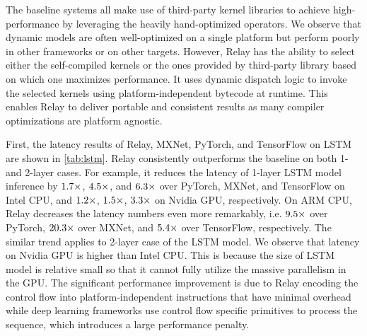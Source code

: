 The baseline systems all make use of third-party kernel libraries to achieve high-performance by leveraging the heavily hand-optimized operators. We observe that dynamic models are often well-optimized on a single platform but perform poorly in other frameworks or on other targets. However, Relay has the ability to select either the self-compiled kernels or the ones provided by third-party library based on which one maximizes performance. It uses dynamic dispatch logic to invoke the selected kernels using platform-independent bytecode at runtime. This enables Relay to deliver portable and consistent results as many compiler optimizations are platform agnostic.

First, the latency results of Relay, MXNet, PyTorch, and TensorFlow on LSTM are shown in \autoref{tab:lstm}. Relay consistently outperforms the baseline on both 1- and 2-layer cases. For example, it reduces the latency of 1-layer LSTM model inference by $\fpeval{round(79.3 / 47.8, 1)}\times$, $\fpeval{round(212.9 / 47.8, 1)}\times$, and $\fpeval{round(301.4 / 47.8, 1)}\times$ over PyTorch, MXNet, and TensorFlow on Intel CPU,
and $\fpeval{round(110.3/93.0, 1)}\times$, $\fpeval{round(135.7/93.0, 1)}\times$, $\fpeval{round(304.7/93.0, 1)}\times$ on Nvidia GPU, respectively.
On ARM CPU, Relay decreases the latency numbers even more remarkably, i.e. $\fpeval{round(1729.5 / 182.2, 1)}\times$ over PyTorch, $\fpeval{round(3695.9 / 182.2, 1)}\times$ over MXNet, and $\fpeval{round(978.3 / 182.2, 1)}\times$ over TensorFlow, respectively.
The similar trend applies to 2-layer case of the LSTM model.
We observe that latency on Nvidia GPU is higher than Intel CPU. This is because the size of LSTM model is relative small so that it cannot fully utilize the massive parallelism in the GPU.
The significant performance improvement is due to Relay encoding the control flow into platform-independent instructions that have minimal overhead while deep learning frameworks use control flow specific primitives to process the sequence, which introduces a large performance penalty.

